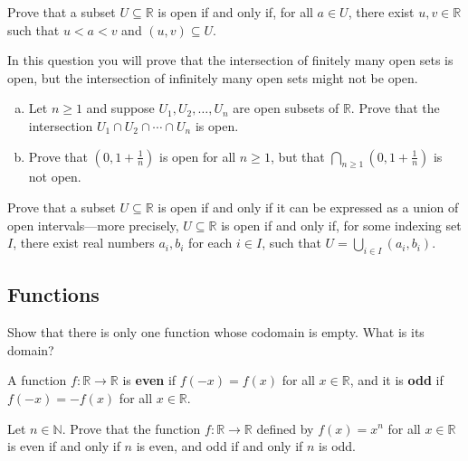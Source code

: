 \begin{chapex}
Prove that a subset $U \subseteq \mathbb{R}$ is open if and only if, for all $a \in U$, there exist $u,v \in \mathbb{R}$ such that $u<a<v$ and $(u,v) \subseteq U$.
\end{chapex}

\begin{chapex}
In this question you will prove that the intersection of finitely many open sets is open, but the intersection of infinitely many open sets might not be open.
\begin{enumerate}[(a)]
\item Let $n \ge 1$ and suppose $U_1, U_2, \dots, U_n$ are open subsets of $\mathbb{R}$. Prove that the intersection $U_1 \cap U_2 \cap \cdots \cap U_n$ is open.
\item Prove that $(0,1+\frac{1}{n})$ is open for all $n \ge 1$, but that $\bigcap_{n \ge 1} (0,1+\textstyle\frac{1}{n})$ is not open.
\end{enumerate}
\end{chapex}

\begin{chapex}
\label{cqOpenSubsetsOfREnd}
Prove that a subset $U \subseteq \mathbb{R}$ is open if and only if it can be expressed as a union of open intervals---more precisely, $U \subseteq \mathbb{R}$ is open if and only if, for some indexing set $I$, there exist real numbers $a_i, b_i$ for each $i \in I$, such that $U = \bigcup_{i \in I} (a_i, b_i)$.
\end{chapex}

\subsection*{Functions}

\begin{chapex}
Show that there is only one function whose codomain is empty. What is its domain?
\end{chapex}

\begin{definition}
\label{defEvenOddFunction}
A function $f : \mathbb{R} \to \mathbb{R}$ is \textbf{even} if $f(-x)=f(x)$ for all $x \in \mathbb{R}$, and it is \textbf{odd} if $f(-x)=-f(x)$ for all $x \in \mathbb{R}$.
\end{definition}

\begin{chapex}
Let $n \in \mathbb{N}$. Prove that the function $f : \mathbb{R} \to \mathbb{R}$ defined by $f(x)=x^n$ for all $x \in \mathbb{R}$ is even if and only if $n$ is even, and odd if and only if $n$ is odd.
\end{chapex}


